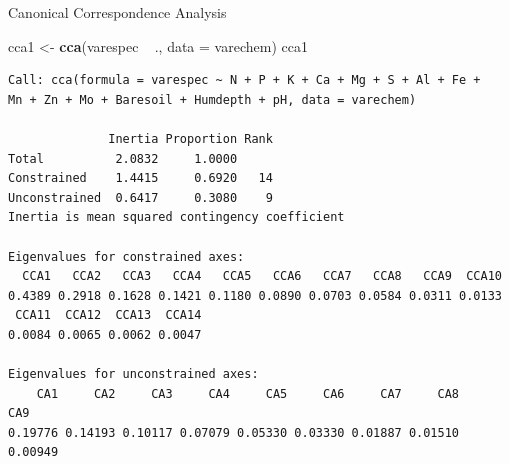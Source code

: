 \documentclass[10pt,ignorenonframetext,compress, aspectratio=169]{beamer}
\newenvironment{Shaded}{\begin{snugshade}}{\end{snugshade}}
\newcommand{\KeywordTok}[1]{\textcolor[rgb]{0.13,0.29,0.53}{\textbf{{#1}}}}
\newcommand{\DataTypeTok}[1]{\textcolor[rgb]{0.13,0.29,0.53}{{#1}}}
\newcommand{\StringTok}[1]{\textcolor[rgb]{0.31,0.60,0.02}{{#1}}}
\newcommand{\NormalTok}[1]{{#1}}
\begin{document}
\begin{frame}[fragile]{Canonical Correspondence Analysis}

\tiny

\begin{Shaded}
\begin{Highlighting}[]
\NormalTok{cca1 <-}\StringTok{ }\KeywordTok{cca}\NormalTok{(varespec ~}\StringTok{ }\NormalTok{., }\DataTypeTok{data =} \NormalTok{varechem)}
\NormalTok{cca1}
\end{Highlighting}
\end{Shaded}

\begin{verbatim}
Call: cca(formula = varespec ~ N + P + K + Ca + Mg + S + Al + Fe +
Mn + Zn + Mo + Baresoil + Humdepth + pH, data = varechem)

              Inertia Proportion Rank
Total          2.0832     1.0000     
Constrained    1.4415     0.6920   14
Unconstrained  0.6417     0.3080    9
Inertia is mean squared contingency coefficient 

Eigenvalues for constrained axes:
  CCA1   CCA2   CCA3   CCA4   CCA5   CCA6   CCA7   CCA8   CCA9  CCA10 
0.4389 0.2918 0.1628 0.1421 0.1180 0.0890 0.0703 0.0584 0.0311 0.0133 
 CCA11  CCA12  CCA13  CCA14 
0.0084 0.0065 0.0062 0.0047 

Eigenvalues for unconstrained axes:
    CA1     CA2     CA3     CA4     CA5     CA6     CA7     CA8     CA9 
0.19776 0.14193 0.10117 0.07079 0.05330 0.03330 0.01887 0.01510 0.00949 
\end{verbatim}

\normalsize

\end{frame}
\end{document}
